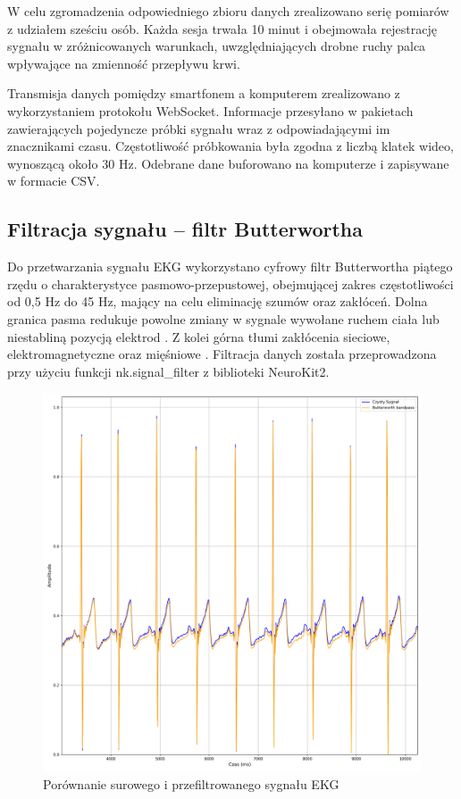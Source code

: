 \documentclass[journal]{IEEEtran}
\begin{document}
W celu zgromadzenia odpowiedniego zbioru danych zrealizowano serię pomiarów z udziałem sześciu osób. Każda sesja trwała 10 minut i obejmowała rejestrację sygnału w zróżnicowanych warunkach, uwzględniających drobne ruchy palca wpływające na zmienność przepływu krwi.

Transmisja danych pomiędzy smartfonem a komputerem zrealizowano z wykorzystaniem protokołu WebSocket. Informacje przesyłano w pakietach zawierających pojedyncze próbki sygnału wraz z odpowiadającymi im znacznikami czasu. Częstotliwość próbkowania była zgodna z liczbą klatek wideo, wynoszącą około 30 Hz. Odebrane dane buforowano na komputerze i zapisywane w formacie CSV.

\subsection{Filtracja sygnału – filtr Butterwortha}
Do przetwarzania sygnału EKG wykorzystano cyfrowy filtr Butterwortha piątego rzędu o charakterystyce pasmowo-przepustowej, obejmującej zakres częstotliwości od 0,5 Hz do 45 Hz, mający na celu eliminację szumów oraz zakłóceń. Dolna granica pasma redukuje powolne zmiany w sygnale wywołane ruchem ciała lub niestabliną pozycją elektrod  \cite{7}. Z kolei górna tłumi zakłócenia sieciowe, elektromagnetyczne oraz mięśniowe  \cite{8}. Filtracja danych została przeprowadzona przy użyciu funkcji nk.signal\_filter z biblioteki NeuroKit2.

\begin{figure}[htbp]
    \centering
    \includegraphics[width=0.76\linewidth]{Filtr_EKG.png} 
    \caption{Porównanie surowego i przefiltrowanego sygnału EKG}
    \label{fig:filtr_ekg}
\end{figure}
\end{document}
